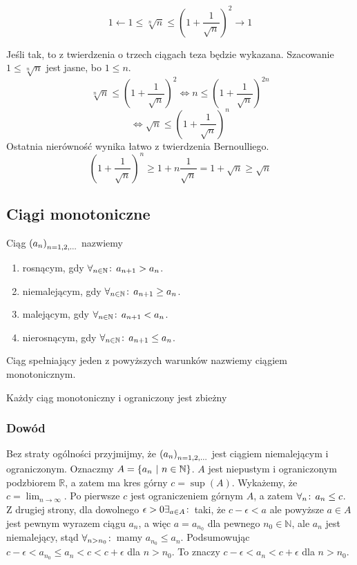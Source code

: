 \documentclass[9pt]{article}
\begin{document}
\[
    1 \leftarrow 1 \le \sqrt[n]{n} \le \left(1+\frac{1}{\sqrt{n}}\right)^2 \rightarrow 1
\]

Jeśli tak, to z twierdzenia o trzech ciągach teza będzie wykazana. Szacowanie $1 \le \sqrt[n]{n}$
jest jasne, bo $1 \le n$.
\[
    \sqrt[n]{n} \le \left(1+\frac{1}{\sqrt{n}}\right)^2 \iff n \le
    \left(1+\frac{1}{\sqrt{n}}\right)^{2n}
\]
\[
    \iff \sqrt{n} \le \left(1 + \frac{1}{\sqrt{n}}\right)^n
\]
Ostatnia nierówność wynika łatwo z twierdzenia Bernoulliego.
\[
    \left(1 + \frac{1}{\sqrt{n}}\right)^n \ge 1 + n\frac{1}{\sqrt{n}} = 1 + \sqrt{n} \ge \sqrt{n}
\]

\subsection{Ciągi monotoniczne}

Ciąg $\left(a_n\right)_{n = 1,2,...}$ nazwiemy
\begin{enumerate}
    \item rosnącym, gdy $\forall_{n \in \mathbb{N}} \! : \, a_{n+1} > a_n$.
    \item niemalejącym, gdy $\forall_{n \in \mathbb{N}} \! : \, a_{n+1} \ge a_n$.
    \item malejącym, gdy $\forall_{n \in \mathbb{N}} \! : \, a_{n+1} < a_n$.
    \item nierosnącym, gdy $\forall_{n \in \mathbb{N}} \! : \, a_{n+1} \le a_n$.
\end{enumerate}

Ciąg spełniający jeden z powyższych warunków nazwiemy ciągiem monotonicznym.

\begin{Twi}
    Każdy ciąg monotoniczny i ograniczony jest zbieżny 
\end{Twi}

\subsubsection*{Dowód}

Bez straty ogólności przyjmijmy, że $\left(a_n\right)_{n = 1,2,...}$ jest ciągiem niemalejącym i ograniczonym. Oznaczmy
$A = \{a_n \ |\  n \in \mathbb{N}\}$. $A$ jest niepustym i ograniczonym podzbiorem $\mathbb{R}$, a
zatem ma kres górny $c = \sup(A)$. Wykażemy, że $c = \lim_{n \to \infty}$. Po pierwsze $c$ jest
ograniczeniem górnym $A$, a zatem $\forall_{n} \! : \, a_n \le c$. Z drugiej strony, dla dowolnego $\epsilon > 0
\exists_{a \in A} \! : \,$ taki, że $c - \epsilon < a$ ale powyższe $a \in A$ jest pewnym wyrazem ciągu $a_n$, a
więc $a = a_{n_0}$ dla pewnego $n_0 \in \mathbb{N}$, ale $a_n$ jest niemalejący, stąd $\forall_{n > n_0} \! : \,$
mamy $a_{n_0} \le a_n$. Podsumowując $c - \epsilon < a_{n_0} \le a_n < c < c+\epsilon$ dla $n >
n_0$. To znaczy $c - \epsilon < a_n < c+ \epsilon$ dla $n > n_0$.
\end{document}
